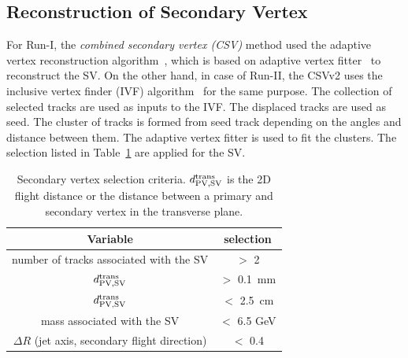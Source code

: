 \subsection{Reconstruction of Secondary Vertex}
For Run-I, the {\em combined secondary vertex (CSV)} method used the adaptive vertex
reconstruction algorithm~\cite{Waltenberger:1166320}, which is based on adaptive vertex
fitter~\cite{Fruhwirth:1027031} to reconstruct the SV.
On the other hand, in case of Run-II, the CSVv2 uses the inclusive vertex finder (IVF)
algorithm~\cite{Khachatryan:2011wq} for the same purpose.
The collection of selected tracks are used as inputs to the IVF. The displaced tracks are used as seed.
The cluster of tracks is formed from seed track depending on the angles and distance between them.
The adaptive vertex fitter is used to fit the clusters.
The selection listed in Table~\ref{tab:sv_sel} are applied for the SV.
\begin{table}
  \caption{Secondary vertex selection criteria. $d_{\rm PV, SV}^{\rm trans}$ is the 2D flight
  distance or the distance between a primary and secondary vertex in the transverse plane.}
 \begin{center}
 \begin{tabular}{cc}\hline\hline
 Variable & selection \\ \hline\hline
     number of tracks associated with the SV & $>$ 2 \\
     $d_{\rm PV, SV}^{\rm trans}$ & $>$ 0.1~\unit{mm} \\
     $d_{\rm PV, SV}^{\rm trans}$ & $<$ 2.5~\unit{cm} \\
     mass associated with the SV & $<$ 6.5 GeV\\
     $\Delta R$ (jet axis, secondary flight direction) & $<$ 0.4\\ \hline
 \end{tabular}
 \end{center}
 \label{tab:sv_sel}
 \end{table}

